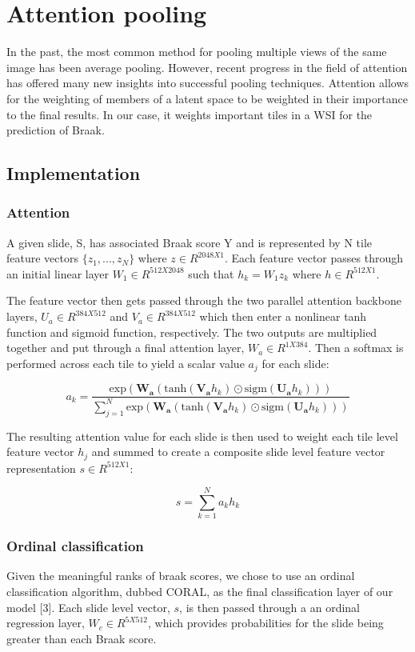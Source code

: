 \documentclass{article} %
\begin{document}
\section{Attention pooling}
\label{pooling}

In the past, the most common method for pooling multiple views of the same image has been average pooling. However, recent progress in the field of attention has offered many new insights into successful pooling techniques. Attention allows for the weighting of members of a latent space to be weighted in their importance to the final results. In our case, it weights important tiles in a WSI for the prediction of Braak. 

\subsection{Implementation}
\subsubsection{Attention}
A given slide, S, has associated Braak score Y and is represented by N tile feature vectors \(\{z_1 , ..., z_N\}\) where \(z\in R^{2048 X 1}\). Each feature vector passes through an initial linear layer \(W_1\in R^{512  X 2048}\) such that \(h_k=W_1 z_k\) where \(h \in R^{512 X 1}\). 

    The feature vector then gets passed through the two parallel attention backbone layers, \(U_a \in R^{384 X 512}\) and \(V_a \in R^{384 X 512}\) which then enter a nonlinear tanh function and sigmoid function, respectively. The two outputs are multiplied together and put through a final attention layer, \(W_a \in R^{1 X 384}\). Then a softmax is performed across each tile to yield a scalar value \(a_j\) for each slide:

\[a_k = \frac{\text{exp}(\mathbf{W_a}(\text{tanh}(\mathbf{V_a}h_k)\odot \text{sigm}(\mathbf{U_a}h_k)))}{\sum_{j=1}^{N}\text{exp}(\mathbf{W_a}(\text{tanh}(\mathbf{V_a}h_k)\odot \text{sigm}(\mathbf{U_a}h_k)))}\]

The resulting attention value for each slide is then used to weight each tile level feature vector \(h_j\) and summed to create a composite slide level feature vector representation \(s \in R^{512 X 1}\):

\[s = \sum_{k=1}^{N}a_kh_k\]

\subsubsection{Ordinal classification}
Given the meaningful ranks of braak scores, we chose to use an ordinal classification algorithm, dubbed CORAL, as the final classification layer of our model [3]. Each slide level vector, \(s\), is then passed through a an ordinal regression layer, \(W_c \in R^{5  X 512}\), which provides probabilities for the slide being greater than each Braak score. 
\end{document}
